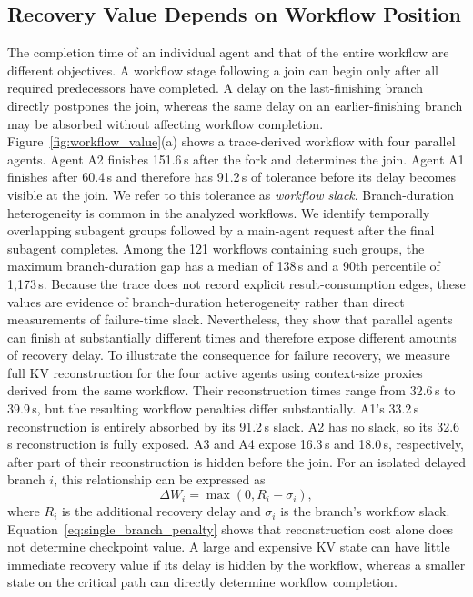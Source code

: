\subsection{Recovery Value Depends on Workflow Position} \label{sec:motivation:differentiated} The completion time of an individual agent and that of the entire workflow are different objectives. A workflow stage following a join can begin only after all required predecessors have completed. A delay on the last-finishing branch directly postpones the join, whereas the same delay on an earlier-finishing branch may be absorbed without affecting workflow completion. 
Figure~\ref{fig:workflow_value}(a) shows a trace-derived workflow with four parallel agents. Agent A2 finishes 151.6\,s after the fork and determines the join. Agent A1 finishes after 60.4\,s and therefore has 91.2\,s of tolerance before its delay becomes visible at the join. We refer to this tolerance as \emph{workflow slack}. Branch-duration heterogeneity is common in the analyzed workflows. We identify temporally overlapping subagent groups followed by a main-agent request after the final subagent completes. Among the 121 workflows containing such groups, the maximum branch-duration gap has a median of 138\,s and a 90th percentile of 1,173\,s. Because the trace does not record explicit result-consumption edges, these values are evidence of branch-duration heterogeneity rather than direct measurements of failure-time slack. Nevertheless, they show that parallel agents can finish at substantially different times and therefore expose different amounts of recovery delay. To illustrate the consequence for failure recovery, we measure full KV reconstruction for the four active agents using context-size proxies derived from the same workflow. Their reconstruction times range from 32.6\,s to 39.9\,s, but the resulting workflow penalties differ substantially. A1's 33.2\,s reconstruction is entirely absorbed by its 91.2\,s slack. A2 has no slack, so its 32.6\,s reconstruction is fully exposed. A3 and A4 expose 16.3\,s and 18.0\,s, respectively, after part of their reconstruction is hidden before the join. For an isolated delayed branch $i$, this relationship can be expressed as \begin{equation} \Delta W_i = \max(0, R_i - \sigma_i), \label{eq:single_branch_penalty} \end{equation} where $R_i$ is the additional recovery delay and $\sigma_i$ is the branch's workflow slack. Equation~\ref{eq:single_branch_penalty} shows that reconstruction cost alone does not determine checkpoint value. A large and expensive KV state can have little immediate recovery value if its delay is hidden by the workflow, whereas a smaller state on the critical path can directly determine workflow completion. 

